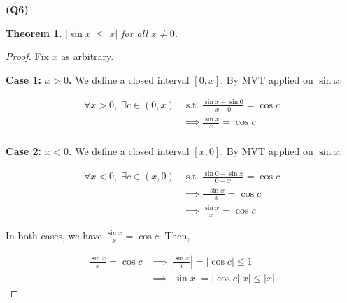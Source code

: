 \documentclass[12pt, a4paper]{article}
\newcommand{\st}{\text{ s.t. }}
\newtheorem{theorem}{Theorem}
\begin{document}
\textbf{(Q6)}

\begin{theorem}
    $|\sin x| \leq |x|$ for all $x \neq 0$.
\end{theorem}

\begin{proof}
    Fix $x$ as arbitrary.
    
    \textbf{Case 1: $x > 0$.} 
    We define a closed interval $[0, x]$. By MVT applied on $\sin x$:

    \begin{align*}
        \forall x > 0,\; \exists c \in (0, x) & \st \frac{\sin x - \sin 0}{x - 0} = \cos c\\
        & \implies \frac{\sin x}{x} = \cos c\\
    \end{align*}

    \textbf{Case 2: $x < 0$.}
    We define a closed interval $[x, 0]$. By MVT applied on $\sin x$:

    \begin{align*}
        \forall x < 0,\; \exists c \in (x, 0) & \st \frac{\sin 0- \sin x}{0 - x} = \cos c\\
        & \implies \frac{-\sin x}{-x} = \cos c\\
        & \implies \frac{\sin x}{x} = \cos c
    \end{align*}

    In both cases, we have $\displaystyle\frac{\sin x}{x} = \cos c$. Then,

    \begin{align*}
        \frac{\sin x}{x} = \cos c & \implies \left|\frac{\sin x}{x}\right| = |\cos c| \leq 1\\
        & \implies |\sin x| = |\cos c||x| \leq |x|
    \end{align*}
\end{proof}
\end{document}
